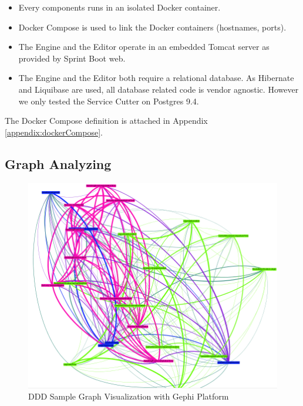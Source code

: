 \begin{itemize}
\item Every components runs in an isolated Docker\cite{docker} container.
\item Docker Compose\cite{dockercompose} is used to link the Docker containers (hostnames, ports).
\item The Engine and the Editor operate in an embedded Tomcat server as provided by Sprint Boot web.
\item The Engine and the Editor both require a relational database. As Hibernate\cite{hibernate} and Liquibase\cite{liquibase} are used, all database related code is vendor agnostic. However we only tested the Service Cutter on Postgres 9.4\cite{postgres}.
\end{itemize}

The Docker Compose definition is attached in Appendix \ref{appendix:dockerCompose}.


\subsection{Graph Analyzing}

\begin{figure}[H]
	\includegraphics[scale=0.7]{images/ddd_semantic_proximity_debug.png}
	\caption{DDD Sample Graph Visualization with Gephi Platform}
	\label{fig:dddSampleGraph}
\end{figure}

